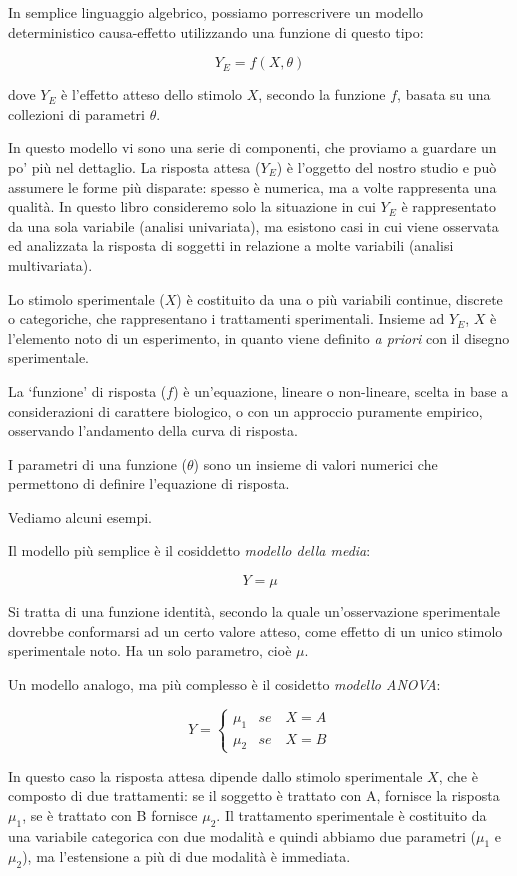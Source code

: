 \documentclass[a4paper,12pt,oneside]{book}
\begin{document}
In semplice linguaggio algebrico, possiamo porrescrivere un modello deterministico causa-effetto utilizzando una funzione di questo tipo:

\[ Y_E = f(X, \theta) \]

dove \(Y_E\) è l'effetto atteso dello stimolo \(X\), secondo la funzione \(f\), basata su una collezioni di parametri \(\theta\).

In questo modello vi sono una serie di componenti, che proviamo a guardare un po' più nel dettaglio. La risposta attesa (\(Y_E\)) è l'oggetto del nostro studio e può assumere le forme più disparate: spesso è numerica, ma a volte rappresenta una qualità. In questo libro consideremo solo la situazione in cui \(Y_E\) è rappresentato da una sola variabile (analisi univariata), ma esistono casi in cui viene osservata ed analizzata la risposta di soggetti in relazione a molte variabili (analisi multivariata).

Lo stimolo sperimentale (\(X\)) è costituito da una o più variabili continue, discrete o categoriche, che rappresentano i trattamenti sperimentali. Insieme ad \(Y_E\), \(X\) è l'elemento noto di un esperimento, in quanto viene definito \emph{a priori} con il disegno sperimentale.

La `funzione' di risposta (\(f\)) è un'equazione, lineare o non-lineare, scelta in base a considerazioni di carattere biologico, o con un approccio puramente empirico, osservando l'andamento della curva di risposta.

I parametri di una funzione (\(\theta\)) sono un insieme di valori numerici che permettono di definire l'equazione di risposta.

Vediamo alcuni esempi.

Il modello più semplice è il cosiddetto \emph{modello della media}:

\[ Y = \mu \]

Si tratta di una funzione identità, secondo la quale un'osservazione sperimentale dovrebbe conformarsi ad un certo valore atteso, come effetto di un unico stimolo sperimentale noto. Ha un solo parametro, cioè \(\mu\).

Un modello analogo, ma più complesso è il cosidetto \emph{modello ANOVA}:

\[
Y = \left\{ {\begin{array}{ll}
\mu_1 & se \quad X = A \\
\mu_2 & se \quad X = B
\end{array}} \right.
\]

In questo caso la risposta attesa dipende dallo stimolo sperimentale \(X\), che è composto di due trattamenti: se il soggetto è trattato con A, fornisce la risposta \(\mu_1\), se è trattato con B fornisce \(\mu_2\). Il trattamento sperimentale è costituito da una variabile categorica con due modalità e quindi abbiamo due parametri (\(\mu_1\) e \(\mu_2\)), ma l'estensione a più di due modalità è immediata.
\end{document}
